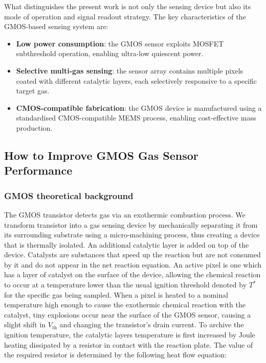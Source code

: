 What distinguishes the present work is not only the sensing device but also its
mode of operation and signal readout strategy. The key characteristics of the
GMOS-based sensing system are:
\begin{itemize}
  \item \textbf{Low power consumption}: the GMOS sensor exploits MOSFET
        subthreshold operation, enabling ultra-low quiescent power.
  \item \textbf{Selective multi-gas sensing}: the sensor array contains
        multiple pixels coated with different catalytic layers, each
        selectively responsive to a specific target gas.
  \item \textbf{CMOS-compatible fabrication}: the GMOS device is manufactured
        using a standardised CMOS-compatible MEMS process, enabling
        cost-effective mass production.
\end{itemize}

\subsection{How to Improve GMOS Gas Sensor Performance}
\subsubsection{GMOS theoretical background}
The GMOS transistor detects gas via an exothermic combustion process. We 
transform transistor into a gas sensing device by mechanically separating it 
from its surrounding substrate using a micro-machining process, thus creating 
a device that is thermally isolated. An additional catalytic layer is added on 
top of the device. Catalysts are substances that speed up the reaction but are 
not consumed by it and do not appear in the net reaction equation. An active
pixel is one which has a layer of catalyst on the surface of the device,
allowing the chemical reaction to occur at a temperature lower than
the usual ignition threshold denoted by $T^*$ for the specific gas being sampled. 
When a pixel is heated to a nominal temperature high enough to cause the
exothermic chemical reaction with the catalyst, tiny explosions occur near the
surface of the GMOS sensor, causing a slight shift in $V_{\mathrm{th}}$ and
changing the transistor's drain
current. To archive the ignition temperature, the catalytic layers temperature 
is first increased by Joule heating dissipated by a resistor in contact with the 
reaction plate. The value of the required resistor is determined by the following 
heat flow equation:

